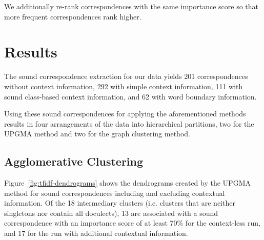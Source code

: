 \documentclass[a4paper]{article}
\begin{document}
We additionally re-rank correspondences
with the same importance score
so that more frequent correspondences rank higher.

\section{Results}
\label{sec:results}

The sound correspondence extraction for our data
yields 201 correspondences without context information,
292 with simple context information,
111 with sound class-based context information,
and 62 with word boundary information.

Using these sound correspondences for
applying the aforementioned methods results in
four arrangements of the data into hierarchical partitions,
two for the UPGMA method and two for the graph clustering method.

\subsection{Agglomerative Clustering}

Figure~\ref{fig:tfidf-dendrograms} shows the dendrograms
created by the UPGMA method for sound correspondences
including and excluding contextual information.
Of the 18 intermediary clusters
(i.e. clusters that are neither singletons nor contain all doculects),
13 are associated with a sound correspondence with an importance score of at least 70\% for the context-less run,
and 17 for the run with additional contextual information.
\end{document}
